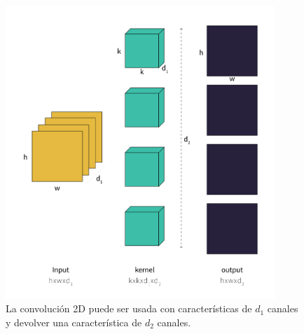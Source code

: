 \begin{figure}[H]
    \centering
    \includegraphics[width=4in]{../cap2_CNNs/src/conv2d.png}
    \caption{La convolución 2D puede ser usada con características de $d_1$ canales y devolver una característica de $d_2$ canales.} 
\end{figure}
